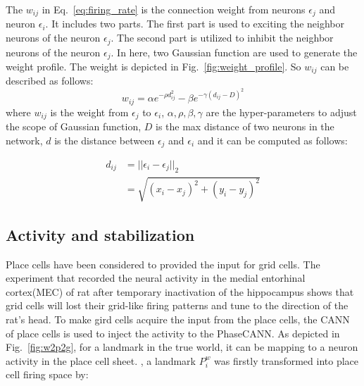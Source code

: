 \documentclass[final,5p,times,twocolumn]{elsarticle}
\newcommand{\pt}[1]{{\color{red}{#1}}}
\begin{document}
The $w_{ij}$ in Eq.~\eqref{eq:firing_rate} is the connection weight from neurons $\epsilon_j$ and neuron $\epsilon_i$. It includes two parts. The first part is used to exciting the neighbor neurons of the neuron $\epsilon_j$. The second part is utilized to inhibit the neighbor neurons of the neuron $\epsilon_j$. In here, two Gaussian function are used to generate the weight profile. The weight is depicted in Fig.~\ref{fig:weight_profile}. So $w_{ij}$ can be described as follows:
\begin{equation}\label{eq:weight_gc}
	w_{ij}=\alpha e^{-\rho d_{ij}^2} - \beta e^{-\gamma (d_{ij}-D)^2}
\end{equation}
where $w_{ij}$ is the weight from $\epsilon_{j}$ to $\epsilon_{i}$, $\alpha,\rho,\beta,\gamma$ are the hyper-parameters to adjust the scope of Gaussian function, $D$ is the max distance of two neurons in the network, $d$ is the distance between $\epsilon_{j}$ and $\epsilon_{i}$ and it can be computed as follows:

\begin{align}
	d_{ij} &= ||\epsilon_{i} - \epsilon_{j}||_2 \\
	&=\sqrt{(x_i-x_j)^2+(y_i-y_j)^2}	 
\end{align}	

\subsection{Activity and stabilization}

Place cells have been considered to provided the input for grid cells. The experiment that recorded the neural activity in the medial entorhinal cortex(MEC) of rat after temporary inactivation of the hippocampus shows that grid cells will lost their grid-like firing patterns and tune to the direction of the rat's head\citep{Bonnevie2013}. To make gird cells acquire the input from the place cells, the CANN of place cells\citep{McNaughton2006} is used to inject the activity to the PhaseCANN. As depicted in Fig.~\ref{fig:w2p2g}, for a landmark in the true world, it can be mapping to a neuron activity in the place cell sheet. \pt{According to our previous work}, a landmark $P^w_i$ was firstly transformed into place cell firing space by:
\end{document}
